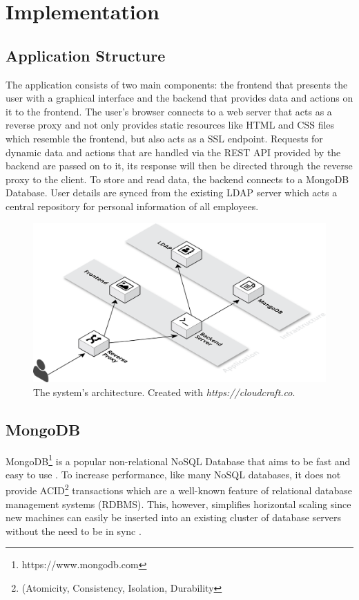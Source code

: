 \chapter{Implementation}
\section{Application Structure}
The application consists of two main components: the frontend that presents the user with a graphical interface and the backend that provides data and actions on it to the frontend.
The user's browser connects to a web server that acts as a reverse proxy and not only provides static resources like HTML and CSS files which resemble the frontend, but also acts as a SSL endpoint.
Requests for dynamic data and actions that are handled via the REST API provided by the backend are passed on to it, its response will then be directed through the reverse proxy to the client.
To store and read data, the backend connects to a MongoDB Database. User details are synced from the existing LDAP server which acts a central repository for personal information of all employees.
\begin{figure}[h]
    \centering
    \includegraphics[width=\textwidth]{images/system_architecture.png}
    \caption[System Architecture]{The system's architecture. Created with \textit{https://cloudcraft.co}.}
    \label{fig:markovchain}
\end{figure}

\newpage
\section{MongoDB}
MongoDB\footnote{https://www.mongodb.com} is a popular non-relational NoSQL Database that aims to be fast and easy to use \cite[p. 10]{MongoGuide}. To increase performance, like many NoSQL databases, it does not provide ACID\footnote{(Atomicity, Consistency, Isolation, Durability} transactions which are a well-known feature of relational database management systems (RDBMS). This, however, simplifies horizontal scaling since new machines can easily be inserted into an existing cluster of database servers without the need to be in sync \cite[p. 3]{MongoGuide}.

